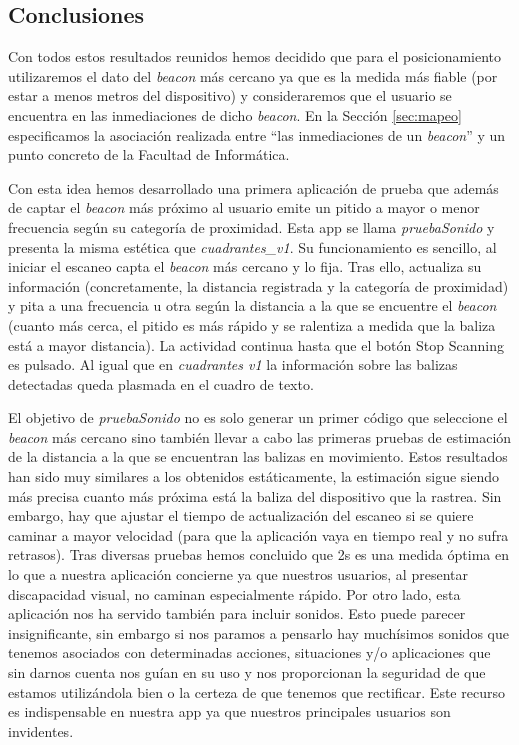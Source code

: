 \subsection{Conclusiones}
\label{sub:conclusiones_posicionam}
Con todos estos resultados reunidos hemos decidido que para el posicionamiento utilizaremos el dato del \textit{beacon} más cercano ya que es la medida más fiable (por estar a menos metros del dispositivo) y consideraremos que el usuario se encuentra en las inmediaciones de dicho \textit{beacon}. En la Sección \ref{sec:mapeo} especificamos la asociación realizada entre ``las inmediaciones de un \textit{beacon}'' y un punto concreto de la Facultad de Informática.

Con esta idea hemos desarrollado una primera aplicación de prueba que además de captar el \textit{beacon} más próximo al usuario emite un pitido a mayor o menor frecuencia según su categoría de proximidad. Esta app se llama \textit{pruebaSonido} y presenta la misma estética que \textit{cuadrantes\_v1}. Su funcionamiento es sencillo, al iniciar el escaneo capta el \textit{beacon} más cercano y lo fija. Tras ello, actualiza su información (concretamente, la distancia registrada y la categoría de proximidad) y pita a una frecuencia u otra según la distancia a la que se encuentre el \textit{beacon} (cuanto más cerca, el pitido es más rápido y se ralentiza a medida que la baliza está a mayor distancia). La actividad continua hasta que el botón Stop Scanning es pulsado. Al igual que en \textit{cuadrantes v1} la información sobre las balizas detectadas queda plasmada en el cuadro de texto.

El objetivo de \textit{pruebaSonido} no es solo generar un primer código que seleccione el \textit{beacon} más cercano sino también llevar a cabo las primeras pruebas de estimación de la distancia a la que se encuentran las balizas en movimiento. Estos resultados han sido muy similares a los obtenidos estáticamente, la estimación sigue siendo más precisa cuanto más próxima está la baliza del dispositivo que la rastrea. Sin embargo, hay que ajustar el tiempo de actualización del escaneo si se quiere caminar a mayor velocidad (para que la aplicación vaya en tiempo real y no sufra retrasos). Tras diversas pruebas hemos concluido que 2s es una medida óptima en lo que a nuestra aplicación concierne ya que nuestros usuarios, al presentar discapacidad visual, no caminan especialmente rápido. Por otro lado, esta aplicación nos ha servido también para incluir sonidos. Esto puede parecer insignificante, sin embargo si nos paramos a pensarlo hay muchísimos sonidos que tenemos asociados con determinadas acciones, situaciones y/o aplicaciones que sin darnos cuenta nos guían en su uso y nos proporcionan la seguridad de que estamos utilizándola bien o la certeza de que tenemos que rectificar. Este recurso es indispensable en nuestra app ya que nuestros principales usuarios son invidentes.

